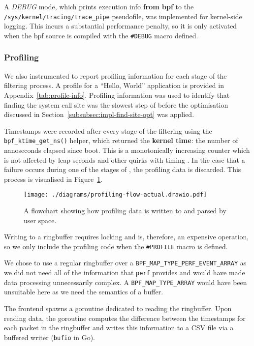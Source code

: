A \textit{DEBUG} mode,
which prints execution info \textbf{from \ac{bpf}} to the
\texttt{/sys/kernel/tracing/trace\_pipe} pseudofile, was implemented for
kernel-side logging. This incurs a substantial performance penalty, so it is only
activated when the \ac{bpf} source is compiled with the \texttt{\#DEBUG} macro
defined.

\subsubsection{Profiling}

We also instrumented \af to report profiling information for each stage of the
filtering process. A profile for a ``Hello, World'' application is provided in 
Appendix~\ref{tab:profile-info}. Profiling information was used to identify that
finding the system call site was the slowest step of \af before the optimisation
discussed in Section~\ref{subsubsec:impl-find-site-opt} was applied.

Timestamps were recorded after every stage of the filtering using the
\texttt{bpf\_ktime\_get\_ns()} helper, which returned the \textbf{kernel time}:
the number of nanoseconds elapsed since boot. This is a monotonically increasing
counter which is not affected by leap seconds and other quirks with timing
\cite{ebpf-bpf-ktime-get-ns-2025, LAMPORT_CLOCKS}. In the
case that a failure occurs during one of the stages of \af, the profiling data
is discarded. This process is visualised in
Figure~\ref{fig:profiling-data-flow}.

\begin{figure}[hbpt]
\centering
\texttt{[image: ./diagrams/profiling-flow-actual.drawio.pdf]}
\caption{A flowchart showing how profiling data is written to and parsed by
user space.}
\label{fig:profiling-data-flow}
\end{figure}

Writing to a ringbuffer requires locking and is, therefore, an expensive
operation, so we only include the profiling code when the \texttt{\#PROFILE} macro
is defined.

We chose to use a regular ringbuffer over a 
\texttt{BPF\_MAP\_TYPE\_PERF\_EVENT\_ARRAY} as we did not need all of the
information that \texttt{perf} provides and would have made data processing
unnecessarily complex. A \texttt{BPF\_MAP\_TYPE\_ARRAY} would have been
unsuitable here as we need the semantics of a buffer.

The frontend spawns a goroutine dedicated to reading the ringbuffer.
Upon reading data, the goroutine computes the difference between the timestamps for each 
packet in the ringbuffer and writes this information to a CSV file via a
buffered writer (\texttt{bufio} in Go). 

